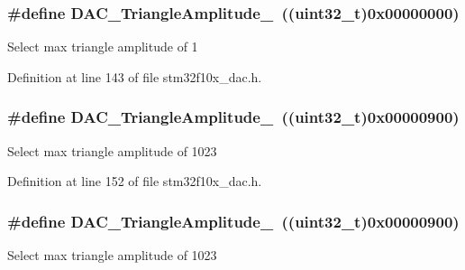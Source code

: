 \subsubsection[{\texorpdfstring{D\+A\+C\+\_\+\+Triangle\+Amplitude\+\_\+1}{DAC_TriangleAmplitude_1}}]{\setlength{\rightskip}{0pt plus 5cm}\#define D\+A\+C\+\_\+\+Triangle\+Amplitude\+\_~(({\bf uint32\+\_\+t})0x00000000)}\hypertarget{group___d_a_c__lfsrunmask__triangleamplitude_ga49b1eddf4e6371b4be8751162dc94ac4}{}\label{group___d_a_c__lfsrunmask__triangleamplitude_ga49b1eddf4e6371b4be8751162dc94ac4}
Select max triangle amplitude of 1 

Definition at line 143 of file stm32f10x\+\_\+dac.\+h.

\subsubsection[{\texorpdfstring{D\+A\+C\+\_\+\+Triangle\+Amplitude\+\_\+1023}{DAC_TriangleAmplitude_1023}}]{\setlength{\rightskip}{0pt plus 5cm}\#define D\+A\+C\+\_\+\+Triangle\+Amplitude\+\_~(({\bf uint32\+\_\+t})0x00000900)}\hypertarget{group___d_a_c__lfsrunmask__triangleamplitude_ga7d573b0cebb1b939bd83367effb93d89}{}\label{group___d_a_c__lfsrunmask__triangleamplitude_ga7d573b0cebb1b939bd83367effb93d89}
Select max triangle amplitude of 1023 

Definition at line 152 of file stm32f10x\+\_\+dac.\+h.

\subsubsection[{\texorpdfstring{D\+A\+C\+\_\+\+Triangle\+Amplitude\+\_\+1023}{DAC_TriangleAmplitude_1023}}]{\setlength{\rightskip}{0pt plus 5cm}\#define D\+A\+C\+\_\+\+Triangle\+Amplitude\+\_~(({\bf uint32\+\_\+t})0x00000900)}\hypertarget{group___d_a_c__lfsrunmask__triangleamplitude_ga7d573b0cebb1b939bd83367effb93d89}{}\label{group___d_a_c__lfsrunmask__triangleamplitude_ga7d573b0cebb1b939bd83367effb93d89}
Select max triangle amplitude of 1023 

